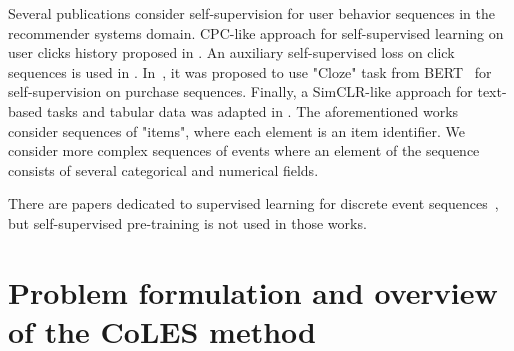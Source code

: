\documentclass[sigconf, anonymous]{acmart}
\newcommand{\R}{\mathbb{R}}
\newcommand{\GG}[1]{\textcolor{red}{[GG: #1]}}
\begin{document}
Several publications consider self-supervision for user behavior sequences in the recommender systems domain.  CPC-like approach for self-supervised learning on user clicks history proposed in \cite{Zhou2020ContrastiveLF}. An auxiliary self-supervised loss on click sequences is used in \cite{Ma2020DisentangledSI}. 
In~\cite{Zhou2020S3RecSL}, it was proposed to use "Cloze" task from BERT~\citep{Devlin2019BERTPO} for self-supervision on purchase sequences. Finally, 
a SimCLR-like approach for text-based tasks and tabular data was adapted in \cite{Yao2020SelfsupervisedLF}. The aforementioned works consider sequences of "items", where each element is an item identifier. We consider more complex sequences of events where an element of the sequence consists of several categorical and numerical fields.

There are papers dedicated to supervised learning for discrete event sequences~\citep{Wiese2009CreditCT, Tobback2019RetailCS, Babaev2019ETRNNAD, chatterjee2003modeling, sinha2014your}, but self-supervised pre-training is not used in those works.



\section{Problem formulation and overview of the CoLES method} \label{sec-method}
\end{document}
